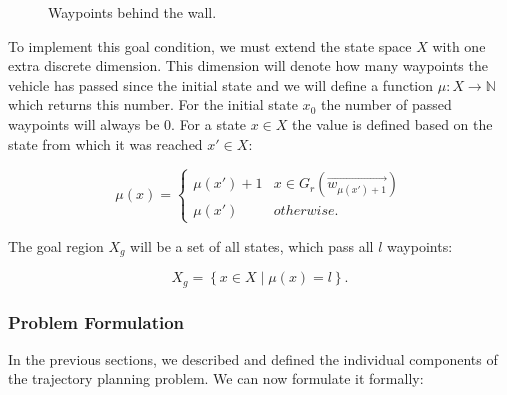\begin{figure}
	\centering
	\caption{Waypoints behind the wall.}
	\label{fig:waypoints}
\end{figure}

To implement this goal condition, we must extend the state space $X$ with one extra discrete dimension. This dimension will denote how many waypoints the vehicle has passed since the initial state and we will define a function $\mu: X\rightarrow \mathbb{N}$ which returns this number. For the initial state $x_0$ the number of passed waypoints will always be 0. For a state $x\in X$ the value is defined based on the state from which it was reached $x'\in X$: 

\begin{equation*}
	\mu(x)=
	\begin{cases}
		\mu(x')+1 & x\in G_r(\vec{w_{\mu(x')+1}}) \\
		\mu(x') & otherwise.
	\end{cases}
\end{equation*}

The goal region $X_g$ will be a set of all states, which pass all $l$ waypoints:

\[
	X_g=\left\{x\in X \mid \mu(x)=l\right\}.
\]

\subsubsection{Problem Formulation}

In the previous sections, we described and defined the individual components of the trajectory planning problem. We can now formulate it formally:

